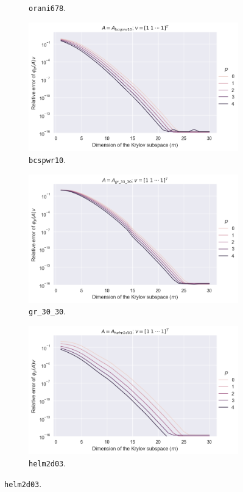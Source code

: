 \begin{figure}[h!]
\begin{subfigure}[b]{0.45\textwidth}
        \caption{\texttt{orani678}.}
    \end{subfigure}
    \hfill
    \begin{subfigure}[b]{0.45\textwidth}
        \includegraphics[width=\textwidth]{img/krylovunivariate/bcspwr10.png}
        \caption{\texttt{bcspwr10}.}
    \end{subfigure}
    \vfill
    \begin{subfigure}[b]{0.45\textwidth}
        \includegraphics[width=\textwidth]{img/krylovunivariate/gr_30_30.png}
        \caption{\texttt{gr\_30\_30}.}
    \end{subfigure}
    \hfill
    \begin{subfigure}[b]{0.45\textwidth}
        \includegraphics[width=\textwidth]{img/krylovunivariate/helm2d03.png}
        \caption{\texttt{helm2d03}.}
    \end{subfigure}


\end{figure}
